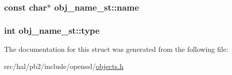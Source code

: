 \subsubsection[{\texorpdfstring{name}{name}}]{\setlength{\rightskip}{0pt plus 5cm}const char$\ast$ obj\+\_\+name\+\_\+st\+::name}\hypertarget{structobj__name__st_a123db40ac48c32bf473c4bdd0dd961fc}{}\label{structobj__name__st_a123db40ac48c32bf473c4bdd0dd961fc}
\subsubsection[{\texorpdfstring{type}{type}}]{\setlength{\rightskip}{0pt plus 5cm}int obj\+\_\+name\+\_\+st\+::type}\hypertarget{structobj__name__st_ac9b1720c0e892bb82abafa95f4c28bfd}{}\label{structobj__name__st_ac9b1720c0e892bb82abafa95f4c28bfd}


The documentation for this struct was generated from the following file\+:\begin{DoxyCompactItemize}
\item 
src/hal/pb2/include/openssl/\hyperlink{objects_8h}{objects.\+h}\end{DoxyCompactItemize}
